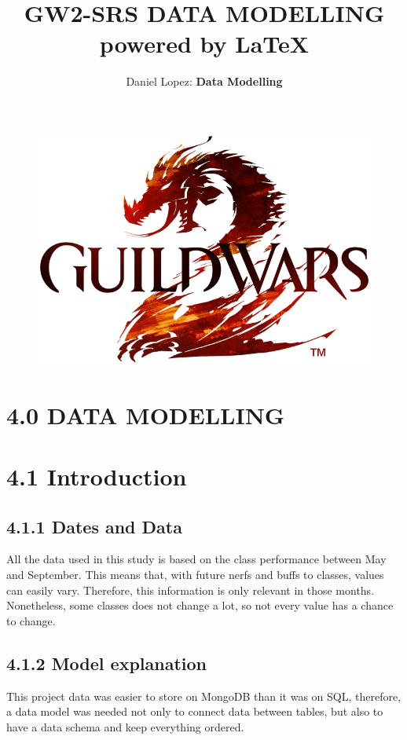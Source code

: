 \documentclass[12pt,a4paper]{article}
\title{%
    \vspace*{-5mm}\Huge GW2-SRS DATA MODELLING \\
    \vspace*{2mm}\Large powered by \LaTeX}
\author{\vspace*{-5mm}\large Daniel Lopez: \textbf{Data Modelling}}
\begin{document}
    
    \maketitle

    \begin{figure}[H]
        \centering
        \includegraphics[width=1 \textwidth]{Images/Nuevo_logo_GW2.png}
    \end{figure}

    \newpage

    \section*{4.0 DATA MODELLING}

    \section*{\large 4.1 Introduction}
    \subsection*{\normalsize 4.1.1 Dates and Data}
    All the data used in this study is based on the class performance between May and September. This means
    that, with future nerfs and buffs to classes, values can easily vary. Therefore, this information is only
    relevant in those months. Nonetheless, some classes does not change a lot, so not every value has a chance
    to change.\\

    \subsection*{\normalsize 4.1.2 Model explanation}
    This project data was easier to store on MongoDB than it was on SQL, therefore, a data model was needed not
    only to connect data between tables, but also to have a data schema and keep everything ordered.
\end{document}
